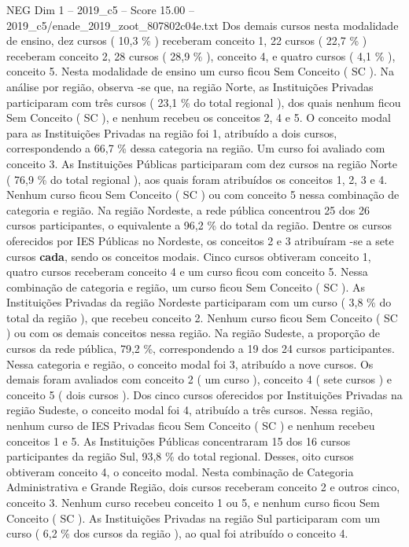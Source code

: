 \begin{textsample}{NEG Dim 1 – 2019\_c5 – Score 15.00 – 2019\_c5/enade\_2019\_zoot\_807802c04e.txt}
Dos demais cursos nesta modalidade de ensino, dez cursos ( 10,3 \% ) receberam conceito 1, 22 cursos ( 22,7 \% ) receberam conceito 2, 28 cursos ( 28,9 \% ), conceito 4, e quatro cursos ( 4,1 \% ), conceito 5.
Nesta modalidade de ensino um curso ficou Sem Conceito ( SC ).
Na análise por região, observa -se que, na região Norte, as Instituições Privadas participaram com três cursos ( 23,1 \% do total regional ), dos quais nenhum ficou Sem Conceito ( SC ), e nenhum recebeu os conceitos 2, 4 e 5.
O conceito modal para as Instituições Privadas na região foi 1, atribuído a dois cursos, correspondendo a 66,7 \% dessa categoria na região.
Um curso foi avaliado com conceito 3.
As Instituições Públicas participaram com dez cursos na região Norte ( 76,9 \% do total regional ), aos quais foram atribuídos os conceitos 1, 2, 3 e 4.
Nenhum curso ficou Sem Conceito ( SC ) ou com conceito 5 nessa combinação de categoria e região.
Na região Nordeste, a rede pública concentrou 25 dos 26 cursos participantes, o equivalente a 96,2 \% do total da região.
Dentre os cursos oferecidos por IES Públicas no Nordeste, os conceitos 2 e 3 atribuíram -se a sete cursos \textbf{cada}, sendo os conceitos modais.
Cinco cursos obtiveram conceito 1, quatro cursos receberam conceito 4 e um curso ficou com conceito 5.
Nessa combinação de categoria e região, um curso ficou Sem Conceito ( SC ).
As Instituições Privadas da região Nordeste participaram com um curso ( 3,8 \% do total da região ), que recebeu conceito 2.
Nenhum curso ficou Sem Conceito ( SC ) ou com os demais conceitos nessa região.
Na região Sudeste, a proporção de cursos da rede pública, 79,2 \%, correspondendo a 19 dos 24 cursos participantes.
Nessa categoria e região, o conceito modal foi 3, atribuído a nove cursos.
Os demais foram avaliados com conceito 2 ( um curso ), conceito 4 ( sete cursos ) e conceito 5 ( dois cursos ).
Dos cinco cursos oferecidos por Instituições Privadas na região Sudeste, o conceito modal foi 4, atribuído a três cursos.
Nessa região, nenhum curso de IES Privadas ficou Sem Conceito ( SC ) e nenhum recebeu conceitos 1 e 5.
As Instituições Públicas concentraram 15 dos 16 cursos participantes da região Sul, 93,8 \% do total regional.
Desses, oito cursos obtiveram conceito 4, o conceito modal.
Nesta combinação de Categoria Administrativa e Grande Região, dois cursos receberam conceito 2 e outros cinco, conceito 3.
Nenhum curso recebeu conceito 1 ou 5, e nenhum curso ficou Sem Conceito ( SC ).
As Instituições Privadas na região Sul participaram com um curso ( 6,2 \% dos cursos da região ), ao qual foi atribuído o conceito 4.

\end{textsample}
